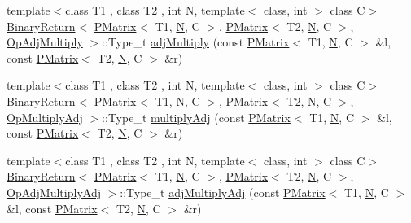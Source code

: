\begin{DoxyCompactItemize}
\item 
{\footnotesize template$<$class T1 , class T2 , int N, template$<$ class, int $>$ class C$>$ }\\\mbox{\hyperlink{structENSEM_1_1BinaryReturn}{Binary\+Return}}$<$ \mbox{\hyperlink{classENSEM_1_1PMatrix}{P\+Matrix}}$<$ T1, \mbox{\hyperlink{operator__name__util_8cc_a7722c8ecbb62d99aee7ce68b1752f337}{N}}, C $>$, \mbox{\hyperlink{classENSEM_1_1PMatrix}{P\+Matrix}}$<$ T2, \mbox{\hyperlink{operator__name__util_8cc_a7722c8ecbb62d99aee7ce68b1752f337}{N}}, C $>$, \mbox{\hyperlink{structENSEM_1_1OpAdjMultiply}{Op\+Adj\+Multiply}} $>$\+::Type\+\_\+t \mbox{\hyperlink{group__primmatrix_gac28cbe7440b96e5650ac2c201b8c5ac2}{adj\+Multiply}} (const \mbox{\hyperlink{classENSEM_1_1PMatrix}{P\+Matrix}}$<$ T1, \mbox{\hyperlink{operator__name__util_8cc_a7722c8ecbb62d99aee7ce68b1752f337}{N}}, C $>$ \&l, const \mbox{\hyperlink{classENSEM_1_1PMatrix}{P\+Matrix}}$<$ T2, \mbox{\hyperlink{operator__name__util_8cc_a7722c8ecbb62d99aee7ce68b1752f337}{N}}, C $>$ \&r)
\item 
{\footnotesize template$<$class T1 , class T2 , int N, template$<$ class, int $>$ class C$>$ }\\\mbox{\hyperlink{structENSEM_1_1BinaryReturn}{Binary\+Return}}$<$ \mbox{\hyperlink{classENSEM_1_1PMatrix}{P\+Matrix}}$<$ T1, \mbox{\hyperlink{operator__name__util_8cc_a7722c8ecbb62d99aee7ce68b1752f337}{N}}, C $>$, \mbox{\hyperlink{classENSEM_1_1PMatrix}{P\+Matrix}}$<$ T2, \mbox{\hyperlink{operator__name__util_8cc_a7722c8ecbb62d99aee7ce68b1752f337}{N}}, C $>$, \mbox{\hyperlink{structENSEM_1_1OpMultiplyAdj}{Op\+Multiply\+Adj}} $>$\+::Type\+\_\+t \mbox{\hyperlink{group__primmatrix_gaf37104443218a1cbaa8ab848065a0a09}{multiply\+Adj}} (const \mbox{\hyperlink{classENSEM_1_1PMatrix}{P\+Matrix}}$<$ T1, \mbox{\hyperlink{operator__name__util_8cc_a7722c8ecbb62d99aee7ce68b1752f337}{N}}, C $>$ \&l, const \mbox{\hyperlink{classENSEM_1_1PMatrix}{P\+Matrix}}$<$ T2, \mbox{\hyperlink{operator__name__util_8cc_a7722c8ecbb62d99aee7ce68b1752f337}{N}}, C $>$ \&r)
\item 
{\footnotesize template$<$class T1 , class T2 , int N, template$<$ class, int $>$ class C$>$ }\\\mbox{\hyperlink{structENSEM_1_1BinaryReturn}{Binary\+Return}}$<$ \mbox{\hyperlink{classENSEM_1_1PMatrix}{P\+Matrix}}$<$ T1, \mbox{\hyperlink{operator__name__util_8cc_a7722c8ecbb62d99aee7ce68b1752f337}{N}}, C $>$, \mbox{\hyperlink{classENSEM_1_1PMatrix}{P\+Matrix}}$<$ T2, \mbox{\hyperlink{operator__name__util_8cc_a7722c8ecbb62d99aee7ce68b1752f337}{N}}, C $>$, \mbox{\hyperlink{structENSEM_1_1OpAdjMultiplyAdj}{Op\+Adj\+Multiply\+Adj}} $>$\+::Type\+\_\+t \mbox{\hyperlink{group__primmatrix_ga81c788e54ea0f4c4de97e7bfa9d7cd89}{adj\+Multiply\+Adj}} (const \mbox{\hyperlink{classENSEM_1_1PMatrix}{P\+Matrix}}$<$ T1, \mbox{\hyperlink{operator__name__util_8cc_a7722c8ecbb62d99aee7ce68b1752f337}{N}}, C $>$ \&l, const \mbox{\hyperlink{classENSEM_1_1PMatrix}{P\+Matrix}}$<$ T2, \mbox{\hyperlink{operator__name__util_8cc_a7722c8ecbb62d99aee7ce68b1752f337}{N}}, C $>$ \&r)

\end{DoxyCompactItemize}
